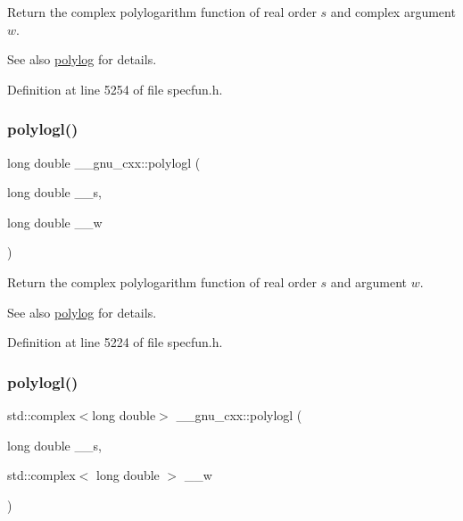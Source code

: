 Return the complex polylogarithm function of real order $ s $ and complex argument $ w $.

\begin{DoxySeeAlso}{See also}
\hyperlink{group__gnu__math__spec__func_gabcc5480ad739561c2debd6a8a352084f}{polylog} for details. 
\end{DoxySeeAlso}


Definition at line 5254 of file specfun.\+h.

\mbox{\label{group__gnu__math__spec__func_ga3aa007b4b4e345c30be015ab145d5598}} 
\subsubsection{\texorpdfstring{polylogl()}{polylogl()}\hspace{0.1cm}{\footnotesize\ttfamily [1/2]}}
{\footnotesize\ttfamily long double \+\_\+\+\_\+gnu\+\_\+cxx\+::polylogl (\begin{DoxyParamCaption}\item[{long double}]{\+\_\+\+\_\+s,  }\item[{long double}]{\+\_\+\+\_\+w }\end{DoxyParamCaption})\hspace{0.3cm}{\ttfamily [inline]}}

Return the complex polylogarithm function of real order $ s $ and argument $ w $.

\begin{DoxySeeAlso}{See also}
\hyperlink{group__gnu__math__spec__func_gabcc5480ad739561c2debd6a8a352084f}{polylog} for details. 
\end{DoxySeeAlso}


Definition at line 5224 of file specfun.\+h.

\mbox{\label{group__gnu__math__spec__func_ga9eb79e506eda210610bc59c1912b4d0f}} 
\subsubsection{\texorpdfstring{polylogl()}{polylogl()}\hspace{0.1cm}{\footnotesize\ttfamily [2/2]}}
{\footnotesize\ttfamily std\+::complex$<$long double$>$ \+\_\+\+\_\+gnu\+\_\+cxx\+::polylogl (\begin{DoxyParamCaption}\item[{long double}]{\+\_\+\+\_\+s,  }\item[{std\+::complex$<$ long double $>$}]{\+\_\+\+\_\+w }\end{DoxyParamCaption})\hspace{0.3cm}{\ttfamily [inline]}}

